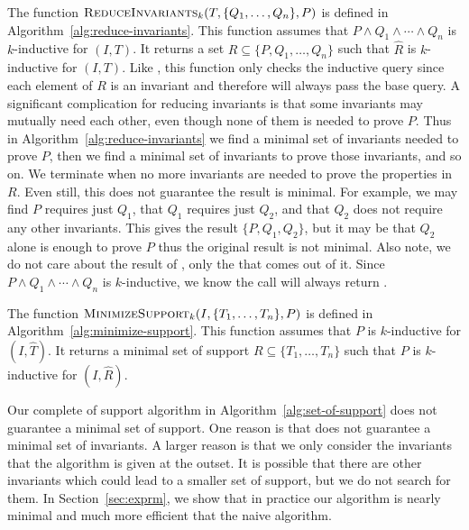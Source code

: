 The function $\textsc{ReduceInvariants}_k(T, \{Q_1, \ldots, Q_n\}, P)$ is defined in
Algorithm~\ref{alg:reduce-invariants}. This function assumes that $P
\land Q_1 \land \cdots \land Q_n$ is $k$-inductive for $(I, T)$. It
returns a set $R \subseteq \{P, Q_1, \ldots, Q_n\}$ such that
$\widehat R$ is $k$-inductive for $(I, T)$. Like \mink, this function
only checks the inductive query since each element of $R$ is an
invariant and therefore will always pass the base query. A significant
complication for reducing invariants is that some invariants may
mutually need each other, even though none of them is needed to prove
$P$. Thus in Algorithm~\ref{alg:reduce-invariants} we find a minimal
set of invariants needed to prove $P$, then we find a minimal set of
invariants to prove those invariants, and so on. We terminate when no
more invariants are needed to prove the properties in $R$. Even still,
this does not guarantee the result is minimal. For example, we may
find $P$ requires just $Q_1$, that $Q_1$ requires just $Q_2$, and that
$Q_2$ does not require any other invariants. This gives the result
$\{P, Q_1, Q_2\}$, but it may be that $Q_2$ alone is enough to prove
$P$ thus the original result is not minimal. Also note, we do not care
about the result of \checksat, only the \unsatcore that comes out of
it. Since $P \land Q_1 \land \cdots \land Q_n$ is $k$-inductive, we
know the \checksat call will always return \unsat.

\begin{algorithm}[t]
  Create activation literals $a_1, \ldots, a_n$ \\
  $T \leftarrow (a_1 \Rightarrow T_1) \land \cdots \land (a_n \Rightarrow T_n)$ \\
  $\checksat(\neg\fq_k(I, T, P))$ \\
  $R \leftarrow \emptyset$ \\
  }
\caption{$\minsupport_k(I, \{T_1, \ldots, T_n\}, P)$}
\label{alg:minimize-support}
\end{algorithm}

The function $\minsupport_k(I, \{T_1, \ldots, T_n\}, P)$ is defined in
Algorithm~\ref{alg:minimize-support}. This function assumes that $P$
is $k$-inductive for $(I, \widehat T)$. It returns a minimal set of
support $R \subseteq \{T_1, \ldots, T_n\}$ such that $P$ is
$k$-inductive for $(I, \widehat R)$.

Our complete of support algorithm in
Algorithm~\ref{alg:set-of-support} does not guarantee a minimal set of
support. One reason is that \reduceinv does not guarantee a minimal
set of invariants. A larger reason is that we only consider the
invariants that the algorithm is given at the outset. It is possible
that there are other invariants which could lead to a smaller set of
support, but we do not search for them. In Section~\ref{sec:exprm}, we
show that in practice our algorithm is nearly minimal and much more
efficient that the naive algorithm.


